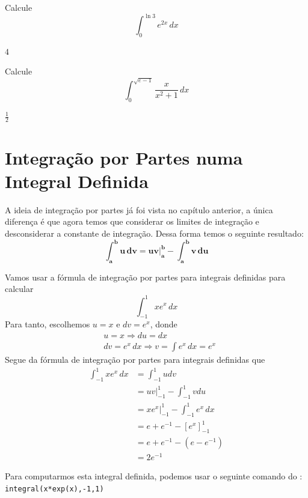 \cleardoublepage\documentclass[../main.tex]{subfiles}
\begin{document}
\begin{exer}
  Calcule
  \begin{equation*}
    \int_0^{\ln 3} e^{2x}\,dx
  \end{equation*}
\end{exer}
\begin{resp}
  $4$
\end{resp}

\begin{exer}
  Calcule
  \begin{equation*}
    \int_0^{\sqrt{e-1}} \frac{x}{x^2+1}\,dx
  \end{equation*}
\end{exer}
\begin{resp}
  $\frac{1}{2}$
\end{resp}

\section{Integração por Partes numa Integral Definida}
A ideia de integração por partes já foi vista no capítulo anterior, a única diferença é que agora temos
que considerar os limites de integração e desconsiderar a constante de integração. Dessa forma temos
o seguinte resultado:
\begin{equation}
  \boldsymbol{\int_{a}^b u\,dv = \left. uv \right|_{a}^b - \int_{a}^b v\,du}
\end{equation}
\begin{ex}
  Vamos usar a fórmula de integração por partes para integrais definidas para calcular
  \begin{equation*}
      \int_{-1}^1 xe^x\,dx
  \end{equation*}
  Para tanto, escolhemos $u = x$ e $dv = e^x$, donde
  \begin{align*}
    & u = x \Rightarrow du = dx \\
    & dv = e^{x}\,dx \Rightarrow v = \int e^{x}\,dx = e^{x}
  \end{align*}
  Segue da fórmula de integração por partes para integrais definidas que
   \begin{align*}
    \int_{-1}^1 xe^x\,dx &= \int_{-1}^1 u dv\\
                         &= uv|_{-1}^1 - \int_{-1}^1 vdu\\
                         &= xe^x|_{-1}^1 - \int_{-1}^1 e^x\,dx\\
                         &= e+e^{-1}-[e^x]_{-1}^1\\
                         &= e+e^{-1}-(e-e^{-1})\\
                         &= 2e^{-1}
  \end{align*}
  
  Para computarmos esta integral definida, podemos usar o seguinte comando do \geogebra:
\verb|integral(x*exp(x),-1,1)|
\end{ex}
\end{document}
